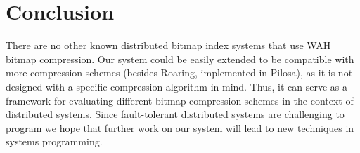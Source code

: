 \section{Conclusion}
There are no other known distributed bitmap index systems
that use WAH bitmap compression. Our system could be easily extended to be
compatible with more compression schemes (besides Roaring, implemented in
Pilosa), as it is not designed with a specific
compression algorithm in mind. Thus, it can serve as a framework for evaluating
different bitmap compression schemes in the context of distributed systems.
Since fault-tolerant distributed systems are challenging to program \cite{kleppmann} we hope that
further work on our system will lead to new techniques in systems programming.
